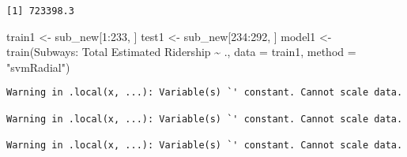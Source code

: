 \documentclass[
  letterpaper,
  DIV=11,
  numbers=noendperiod]{scrartcl}
\newenvironment{Shaded}{\begin{snugshade}}{\end{snugshade}}
\newcommand{\AttributeTok}[1]{\textcolor[rgb]{0.40,0.45,0.13}{#1}}
\newcommand{\DecValTok}[1]{\textcolor[rgb]{0.68,0.00,0.00}{#1}}
\newcommand{\FunctionTok}[1]{\textcolor[rgb]{0.28,0.35,0.67}{#1}}
\newcommand{\NormalTok}[1]{\textcolor[rgb]{0.00,0.23,0.31}{#1}}
\newcommand{\OtherTok}[1]{\textcolor[rgb]{0.00,0.23,0.31}{#1}}
\newcommand{\SpecialCharTok}[1]{\textcolor[rgb]{0.37,0.37,0.37}{#1}}
\newcommand{\StringTok}[1]{\textcolor[rgb]{0.13,0.47,0.30}{#1}}
\begin{document}
\begin{Shaded}
\end{Shaded}

\begin{verbatim}
[1] 723398.3
\end{verbatim}

\begin{Shaded}
\begin{Highlighting}[]
\NormalTok{train1 }\OtherTok{\textless{}{-}}\NormalTok{ sub\_new[}\DecValTok{1}\SpecialCharTok{:}\DecValTok{233}\NormalTok{, ]}
\NormalTok{test1 }\OtherTok{\textless{}{-}}\NormalTok{ sub\_new[}\DecValTok{234}\SpecialCharTok{:}\DecValTok{292}\NormalTok{, ]}
\NormalTok{model1 }\OtherTok{\textless{}{-}} \FunctionTok{train}\NormalTok{(}\StringTok{\textasciigrave{}}\AttributeTok{Subways: Total Estimated Ridership}\StringTok{\textasciigrave{}} \SpecialCharTok{\textasciitilde{}}\NormalTok{ ., }\AttributeTok{data =}\NormalTok{ train1, }\AttributeTok{method =} \StringTok{"svmRadial"}\NormalTok{)}
\end{Highlighting}
\end{Shaded}

\begin{verbatim}
Warning in .local(x, ...): Variable(s) `' constant. Cannot scale data.

Warning in .local(x, ...): Variable(s) `' constant. Cannot scale data.

Warning in .local(x, ...): Variable(s) `' constant. Cannot scale data.
\end{verbatim}
\end{document}
